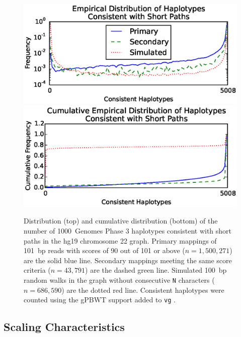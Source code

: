\begin{figure}[h!]
\centering
\includegraphics[width=\linewidth]{figures/03_gpbwt/histogram.eps}
\includegraphics[width=\linewidth]{figures/03_gpbwt/cumulative.eps}
\caption[Consistent haplotypes]{Distribution (top) and cumulative distribution (bottom) of the number of 1000~Genomes Phase 3 haplotypes consistent with short paths in the hg19 chromosome 22 graph. Primary mappings of 101~bp reads with scores of 90 out of 101 or above ($n=1,500,271$) are the solid blue line. Secondary mappings meeting the same score criteria ($n=43,791$) are the dashed green line. Simulated 100~bp random walks in the graph without consecutive \texttt{N} characters ($n=686,590$) are the dotted red line. Consistent haplotypes were counted using the gPBWT support added to \texttt{vg} \cite{garrison2016vg}.}
\label{fig:consistenthaplotypes}
\end{figure}




\subsection{Scaling Characteristics}

